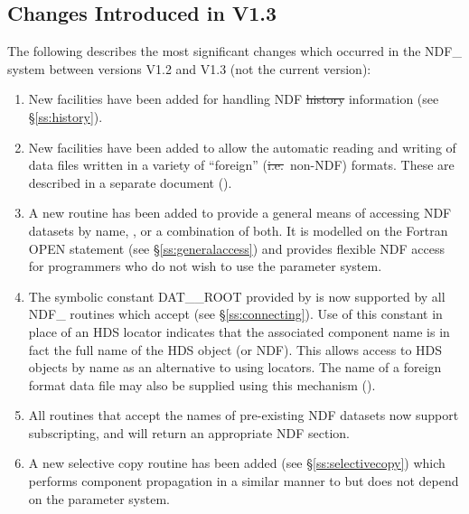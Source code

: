 \subsection{Changes Introduced in V1.3}

The following describes the most significant changes which occurred in
the NDF\_ system between versions V1.2 and V1.3 (not the current
version):

\begin{enumerate}

\item New facilities have been added for handling NDF \st{history\/}
information (see \S\ref{ss:history}).

\item New facilities have been added to allow the automatic reading and writing
of data files written in a variety of ``foreign'' (\st{i.e.}\ non-NDF)
formats. These are described in a separate document
().

\item A new routine  has been added to provide a general
means of accessing NDF datasets by name,
, or a combination of
both. It is modelled on the Fortran OPEN statement (see
\S\ref{ss:generalaccess}) and provides flexible NDF access for
programmers who do not wish to use the  parameter system.

\item The symbolic constant DAT\_\_ROOT provided by  is now
supported by all NDF\_ routines which accept  (see
\S\ref{ss:connecting}). Use of this constant in place of an HDS
locator indicates that the associated component name is in fact the
full name of the HDS object (or NDF). This allows access to HDS
objects by name as an alternative to using locators. The name of a
foreign format data file may also be supplied using this mechanism
().

\item All routines that accept the names of pre-existing NDF datasets now
support subscripting, and will return an appropriate NDF section.

\item A new selective copy routine  has been added (see
\S\ref{ss:selectivecopy}) which performs component propagation in a
similar manner to  but does not depend on the
 parameter system.


\end{enumerate}
